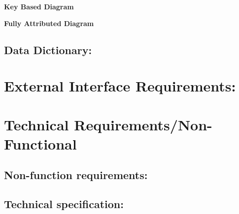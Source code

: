 \documentclass[12pt]{article}
\begin{document}
		\vspace{0.1in}

			\begin{center}
			\textbf{Key Based Diagram}
			\end{center}
		
		\vspace{0.3in}
		
		
		\begin{center}
			\textbf{Fully Attributed Diagram}
			\end{center}
		
		\vspace{0.3in}
		
		

		
	\vspace{0.1in}
	
		\subsection{Data Dictionary:}
		\vspace{0.1in}
		
		
	\vspace{0.5in}
	
	\section{External Interface Requirements:}
	\vspace{0.2in}
	
	
	
	\vspace{0.5in}
	
	\section{Technical Requirements/Non-Functional}
	\vspace{0.2in}
	
		\subsection{Non-function requirements:}
		\vspace{0.1in}
				
		\subsection{Technical specification:} %
		\vspace{0.1in}
		
\end{document}
